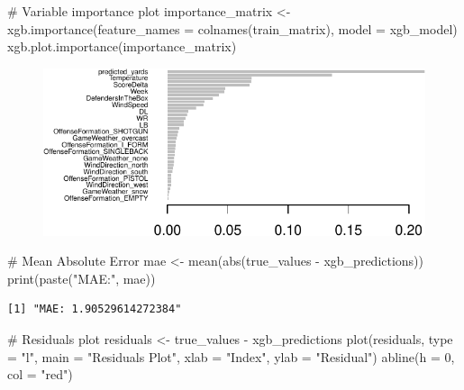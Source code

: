 \documentclass[
  super,
  preprint,
  3p]{elsarticle}
\newenvironment{Shaded}{\begin{snugshade}}{\end{snugshade}}
\newcommand{\AttributeTok}[1]{\textcolor[rgb]{0.40,0.45,0.13}{#1}}
\newcommand{\CommentTok}[1]{\textcolor[rgb]{0.37,0.37,0.37}{#1}}
\newcommand{\DecValTok}[1]{\textcolor[rgb]{0.68,0.00,0.00}{#1}}
\newcommand{\FunctionTok}[1]{\textcolor[rgb]{0.28,0.35,0.67}{#1}}
\newcommand{\NormalTok}[1]{\textcolor[rgb]{0.00,0.23,0.31}{#1}}
\newcommand{\OtherTok}[1]{\textcolor[rgb]{0.00,0.23,0.31}{#1}}
\newcommand{\SpecialCharTok}[1]{\textcolor[rgb]{0.37,0.37,0.37}{#1}}
\newcommand{\StringTok}[1]{\textcolor[rgb]{0.13,0.47,0.30}{#1}}
\begin{document}
\begin{Shaded}
\begin{Highlighting}[]
\CommentTok{\# Variable importance plot}
\NormalTok{importance\_matrix }\OtherTok{\textless{}{-}} \FunctionTok{xgb.importance}\NormalTok{(}\AttributeTok{feature\_names =} \FunctionTok{colnames}\NormalTok{(train\_matrix), }\AttributeTok{model =}\NormalTok{ xgb\_model)}
\FunctionTok{xgb.plot.importance}\NormalTok{(importance\_matrix)}
\end{Highlighting}
\end{Shaded}

\begin{figure}[H]

{\centering \includegraphics{project_report_files/figure-pdf/unnamed-chunk-28-1.pdf}

}

\end{figure}

\begin{Shaded}
\begin{Highlighting}[]
\CommentTok{\# Mean Absolute Error}
\NormalTok{mae }\OtherTok{\textless{}{-}} \FunctionTok{mean}\NormalTok{(}\FunctionTok{abs}\NormalTok{(true\_values }\SpecialCharTok{{-}}\NormalTok{ xgb\_predictions))}
\FunctionTok{print}\NormalTok{(}\FunctionTok{paste}\NormalTok{(}\StringTok{"MAE:"}\NormalTok{, mae))}
\end{Highlighting}
\end{Shaded}

\begin{verbatim}
[1] "MAE: 1.90529614272384"
\end{verbatim}

\begin{Shaded}
\begin{Highlighting}[]
\CommentTok{\# Residuals plot}
\NormalTok{residuals }\OtherTok{\textless{}{-}}\NormalTok{ true\_values }\SpecialCharTok{{-}}\NormalTok{ xgb\_predictions}
\FunctionTok{plot}\NormalTok{(residuals, }\AttributeTok{type =} \StringTok{"l"}\NormalTok{, }\AttributeTok{main =} \StringTok{"Residuals Plot"}\NormalTok{, }\AttributeTok{xlab =} \StringTok{"Index"}\NormalTok{, }\AttributeTok{ylab =} \StringTok{"Residual"}\NormalTok{)}
\FunctionTok{abline}\NormalTok{(}\AttributeTok{h =} \DecValTok{0}\NormalTok{, }\AttributeTok{col =} \StringTok{"red"}\NormalTok{)}
\end{Highlighting}
\end{Shaded}
\end{document}
